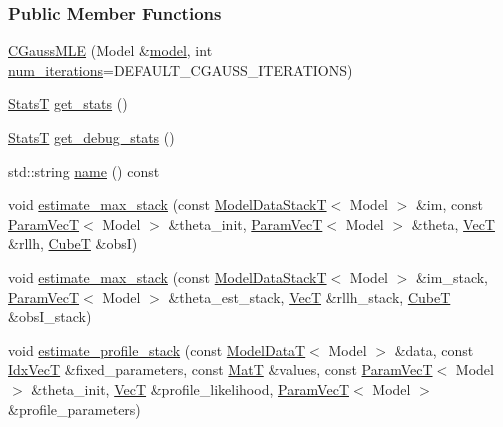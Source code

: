\subsubsection*{Public Member Functions}
\begin{DoxyCompactItemize}
\item 
\hyperlink{classmappel_1_1CGaussMLE_ad2ce9d62edf0d47abb6c4b12abe0c6c6}{C\+Gauss\+M\+LE} (Model \&\hyperlink{classmappel_1_1Estimator_a8322546d87ccdf01f8b0dcd9dae509f0}{model}, int \hyperlink{classmappel_1_1CGaussMLE_a459a28314464b8cd80ff2e4d08dbbeb6}{num\+\_\+iterations}=D\+E\+F\+A\+U\+L\+T\+\_\+\+C\+G\+A\+U\+S\+S\+\_\+\+I\+T\+E\+R\+A\+T\+I\+O\+NS)
\item 
\hyperlink{namespacemappel_a04ab395b0cf82c4ce68a36b2212649a5}{StatsT} \hyperlink{classmappel_1_1CGaussMLE_aafbdebb21652be135801911007d3568b}{get\+\_\+stats} ()
\item 
\hyperlink{namespacemappel_a04ab395b0cf82c4ce68a36b2212649a5}{StatsT} \hyperlink{classmappel_1_1CGaussMLE_aaff3681877cb75e6776be5325adcfea0}{get\+\_\+debug\+\_\+stats} ()
\item 
std\+::string \hyperlink{classmappel_1_1CGaussMLE_af18f123ff581a8ef7332c38d66c6bd42}{name} () const 
\item 
void \hyperlink{classmappel_1_1ThreadedEstimator_afb7a2e27b4e8dcc2fa604f83344461fe}{estimate\+\_\+max\+\_\+stack} (const \hyperlink{namespacemappel_aaeb6665bc57476dd93c2df6ad8bc4768}{Model\+Data\+StackT}$<$ Model $>$ \&im, const \hyperlink{namespacemappel_a0f86d3153e4e27b095012f140eea58de}{Param\+VecT}$<$ Model $>$ \&theta\+\_\+init, \hyperlink{namespacemappel_a0f86d3153e4e27b095012f140eea58de}{Param\+VecT}$<$ Model $>$ \&theta, \hyperlink{namespacemappel_a2225ad69f358daa3f4f99282a35b9a3a}{VecT} \&rllh, \hyperlink{namespacemappel_ab2afab4e6c8805e83946670d882768c2}{CubeT} \&obsI)
\item 
void \hyperlink{classmappel_1_1Estimator_aa1b1c2677df2c6ea9fcf67b6a0856e46}{estimate\+\_\+max\+\_\+stack} (const \hyperlink{namespacemappel_aaeb6665bc57476dd93c2df6ad8bc4768}{Model\+Data\+StackT}$<$ Model $>$ \&im\+\_\+stack, \hyperlink{namespacemappel_a0f86d3153e4e27b095012f140eea58de}{Param\+VecT}$<$ Model $>$ \&theta\+\_\+est\+\_\+stack, \hyperlink{namespacemappel_a2225ad69f358daa3f4f99282a35b9a3a}{VecT} \&rllh\+\_\+stack, \hyperlink{namespacemappel_ab2afab4e6c8805e83946670d882768c2}{CubeT} \&obs\+I\+\_\+stack)
\item 
void \hyperlink{classmappel_1_1ThreadedEstimator_aebbf686f95be1331ff85cecd5a3c97db}{estimate\+\_\+profile\+\_\+stack} (const \hyperlink{namespacemappel_a97f050df953605381ae9c901c3b125f1}{Model\+DataT}$<$ Model $>$ \&data, const \hyperlink{namespacemappel_ac63743dcd42180127307cd0e4ecdd784}{Idx\+VecT} \&fixed\+\_\+parameters, const \hyperlink{namespacemappel_a7091ab87c528041f7e2027195fad8915}{MatT} \&values, const \hyperlink{namespacemappel_a0f86d3153e4e27b095012f140eea58de}{Param\+VecT}$<$ Model $>$ \&theta\+\_\+init, \hyperlink{namespacemappel_a2225ad69f358daa3f4f99282a35b9a3a}{VecT} \&profile\+\_\+likelihood, \hyperlink{namespacemappel_a0f86d3153e4e27b095012f140eea58de}{Param\+VecT}$<$ Model $>$ \&profile\+\_\+parameters)

\end{DoxyCompactItemize}
